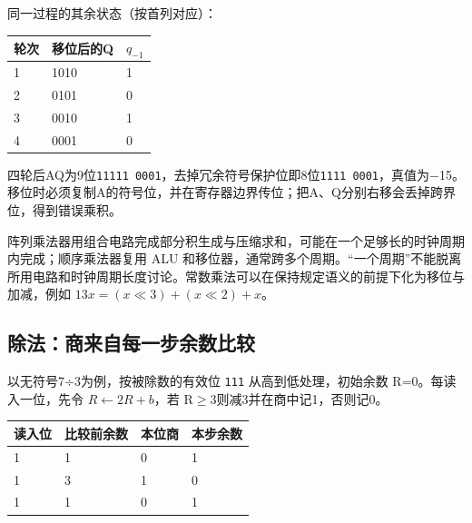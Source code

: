 同一过程的其余状态（按首列对应）：

\par\medskip\noindent\begin{minipage}{\linewidth}\fontsize{9.3}{12}\selectfont\begin{tabularx}{\linewidth}{@{}YYY@{}}
\toprule\noalign{}
轮次 & 移位后的Q & \(q_{-1}\) \\
\midrule\noalign{}


1 & 1010 & 1 \\
2 & 0101 & 0 \\
3 & 0010 & 1 \\
4 & 0001 & 0 \\
\bottomrule\end{tabularx}
\end{minipage}\par\medskip

四轮后AQ为9位\texttt{11111 0001}，去掉冗余符号保护位即8位\texttt{1111 0001}，真值为\ensuremath{-}15。移位时必须复制A的符号位，并在寄存器边界传位；把A、Q分别右移会丢掉跨界位，得到错误乘积。

阵列乘法器用组合电路完成部分积生成与压缩求和，可能在一个足够长的时钟周期内完成；顺序乘法器复用 ALU 和移位器，通常跨多个周期。``一个周期''不能脱离所用电路和时钟周期长度讨论。常数乘法可以在保持规定语义的前提下化为移位与加减，例如 \(13x=(x\ll3)+(x\ll2)+x\)。

\subsection{除法：商来自每一步余数比较}\label{CO02-17}

以无符号7÷3为例，按被除数的有效位 \texttt{111} 从高到低处理，初始余数 R=0。每读入一位，先令 \(R\leftarrow2R+b\)，若 R\ensuremath{\ge}3则减3并在商中记1，否则记0。

\begin{wideblock}\par\medskip\noindent\begin{minipage}{\linewidth}\fontsize{9.3}{12}\selectfont\begin{tabularx}{\linewidth}{@{}YYYY@{}}
\toprule\noalign{}
读入位 & 比较前余数 & 本位商 & 本步余数 \\
\midrule\noalign{}


1 & 1 & 0 & 1 \\
1 & 3 & 1 & 0 \\
1 & 1 & 0 & 1 \\
\bottomrule\end{tabularx}
\end{minipage}\par\medskip\end{wideblock}

